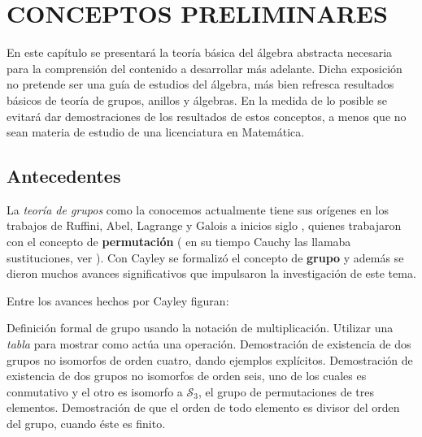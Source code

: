 \chapter{CONCEPTOS PRELIMINARES}
En este capítulo se presentará la teoría básica del álgebra abstracta necesaria para la comprensión del contenido a desarrollar más adelante. Dicha exposición no pretende ser una guía de estudios del álgebra, más bien refresca resultados básicos de teoría de grupos, anillos y álgebras. En la medida de lo posible se evitará dar demostraciones de los resultados de estos conceptos, a menos que no sean materia de estudio de una licenciatura en Matemática.
\section{Antecedentes}
La \textit{teoría de grupos} como la conocemos actualmente tiene sus orígenes en los trabajos de Ruffini, Abel, Lagrange y Galois a inicios siglo , quienes trabajaron con el concepto de \textbf{permutación} ( en su tiempo Cauchy las llamaba \textsf{sustituciones}, ver \cite[p.104]{bib:libroGuti} ). Con Cayley \cite[p. 104]{bib:libroLosGrandes} se formalizó el concepto de \textbf{grupo} y además se dieron muchos avances significativos que impulsaron la investigación de este tema. 

Entre los avances hechos por Cayley figuran:
\begin{bulletList}
\newItem Definición formal de grupo usando la notación de multiplicación.
\newItem Utilizar una \textit{tabla} para mostrar como actúa una operación.
\newItem Demostración de existencia de dos grupos no isomorfos de orden cuatro, dando ejemplos explícitos. 
\newItem Demostración de existencia de dos grupos no isomorfos de orden seis, uno de los cuales es conmutativo y el otro es isomorfo a $\mathcal{S}_3$, el grupo de permutaciones de tres elementos.
\newItem Demostración de que el orden de todo elemento es divisor del orden del grupo, cuando éste es finito. 
\end{bulletList}
